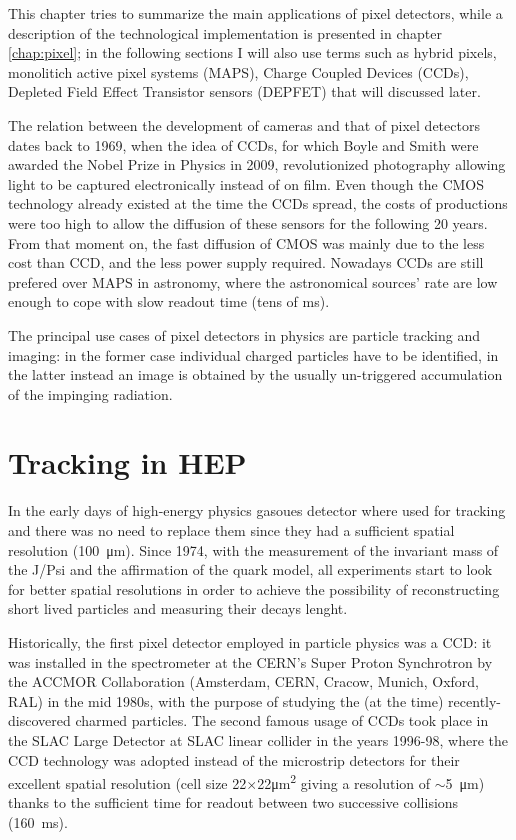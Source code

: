 This chapter tries to summarize the main applications of pixel detectors, while a description of the technological implementation is presented in chapter \ref{chap:pixel}; in the following sections I will also use terms such as hybrid pixels, monolitich active pixel systems (MAPS), Charge Coupled Devices (CCDs), Depleted Field Effect Transistor sensors (DEPFET) that will discussed later. 

The relation between the development of cameras and that of pixel detectors dates back to 1969, when the idea of CCDs, for which Boyle and Smith were awarded the Nobel Prize in Physics in 2009, revolutionized photography allowing light to be captured electronically instead of on film. 
Even though the CMOS technology already existed at the time the CCDs spread, the costs of productions were too high to allow the diffusion of these sensors for the following 20 years. From that moment on, the fast diffusion of CMOS was mainly due to the less cost than CCD, and the less power supply required. Nowadays CCDs are still prefered over MAPS in astronomy, where the astronomical sources' rate are low enough to cope with slow readout time (tens of \si{ms}).  

The principal use cases of pixel detectors in physics are particle tracking and imaging: in the former case individual charged particles have to be identified, in the latter instead an image is obtained by the usually un-triggered accumulation of the impinging radiation. 

\section{Tracking in HEP}
    In the early days of high-energy physics gasoues detector where used for tracking and there was no need to replace them since they had a sufficient spatial resolution (\SI{100}{\um}). Since 1974, with the measurement of the invariant mass of the J/Psi and the affirmation of the quark model, all experiments start to look for better spatial resolutions in order to achieve the possibility of reconstructing short lived particles and measuring their decays lenght.  

    Historically, the first pixel detector employed in particle physics was a CCD: it was installed in the spectrometer at the CERN’s Super Proton Synchrotron by the ACCMOR Collaboration (Amsterdam, CERN, Cracow, Munich, Oxford, RAL) in the mid 1980s, with the purpose of studying the (at the time) recently-discovered charmed particles.
    The second famous usage of CCDs took place in the SLAC Large Detector at SLAC linear collider in the years 1996-98, where the CCD technology was adopted instead of the microstrip detectors for their excellent spatial resolution (cell size 22$\times$22\si{\um\squared} giving a resolution of $\sim$\SI{5}{\um}) thanks to the sufficient time for readout between two successive collisions (\SI{160}{ms}).

